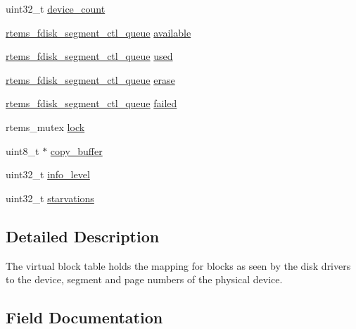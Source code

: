\begin{DoxyCompactItemize}
\item 
uint32\+\_\+t \mbox{\hyperlink{structrtems__flashdisk_a2d9b532c6e34dfe1e54966b5d12ea8b8}{device\+\_\+count}}
\item 
\mbox{\hyperlink{structrtems__fdisk__segment__ctl__queue}{rtems\+\_\+fdisk\+\_\+segment\+\_\+ctl\+\_\+queue}} \mbox{\hyperlink{structrtems__flashdisk_a51504c8aca7771a241e98a587855c66b}{available}}
\item 
\mbox{\hyperlink{structrtems__fdisk__segment__ctl__queue}{rtems\+\_\+fdisk\+\_\+segment\+\_\+ctl\+\_\+queue}} \mbox{\hyperlink{structrtems__flashdisk_a2a733878720c975820498f017ff768ed}{used}}
\item 
\mbox{\hyperlink{structrtems__fdisk__segment__ctl__queue}{rtems\+\_\+fdisk\+\_\+segment\+\_\+ctl\+\_\+queue}} \mbox{\hyperlink{structrtems__flashdisk_ac8d733bbcd13795eac6cc35c3bacf742}{erase}}
\item 
\mbox{\hyperlink{structrtems__fdisk__segment__ctl__queue}{rtems\+\_\+fdisk\+\_\+segment\+\_\+ctl\+\_\+queue}} \mbox{\hyperlink{structrtems__flashdisk_a7f93ff069e9bfb15847029cecf8f1ef8}{failed}}
\item 
rtems\+\_\+mutex \mbox{\hyperlink{structrtems__flashdisk_a297cc8ab6b849e66d5dbfbb0fc51db85}{lock}}
\item 
uint8\+\_\+t $\ast$ \mbox{\hyperlink{structrtems__flashdisk_a5aed5e2e95a207c2bc3efca17e58b052}{copy\+\_\+buffer}}
\item 
uint32\+\_\+t \mbox{\hyperlink{structrtems__flashdisk_a09055a0dde41254d403d3a04727e15a4}{info\+\_\+level}}
\item 
uint32\+\_\+t \mbox{\hyperlink{structrtems__flashdisk_ae0faaafc879c7648666efcbf2dc0bc36}{starvations}}
\end{DoxyCompactItemize}


\subsection{Detailed Description}
The virtual block table holds the mapping for blocks as seen by the disk drivers to the device, segment and page numbers of the physical device. 

\subsection{Field Documentation}
\mbox{\label{structrtems__flashdisk_af447351dbbc46ee4bf84f5a2ba39466f}} 
